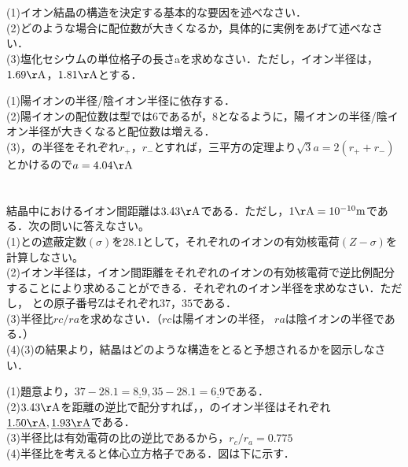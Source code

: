 \documentclass[dvipdfmx]{article}
\begin{document}
  \section{} 
    \begin{tcolorbox}[title=問題]
      (1)イオン結晶の構造を決定する基本的な要因を述べなさい．\\
      (2)どのような場合に配位数が大きくなるか，具体的に実例をあげて述べなさい．\\
      (3)塩化セシウムの単位格子の長さaを求めなさい．ただし，イオン半径は，$1.69 \mathrm{\AA}$，$1.81 \mathrm{\AA}$とする．
    \end{tcolorbox}    
    \begin{tcolorbox}[title=解答]
      (1)陽イオンの半径/陰イオン半径に依存する．\\
      (2)陽イオンの配位数は型では6であるが，8となるように，陽イオンの半径/陰イオン半径が大きくなると配位数は増える．\\
      (3)，の半径をそれぞれ$r_+$，$r_-$とすれば，三平方の定理より$\sqrt{3} a = 2(r_+ + r_-)$とかけるので$a = 4.04 \mathrm{\AA}$
    \end{tcolorbox}
  \section{}
    \begin{tcolorbox}[title=問題]
      結晶中におけるイオン間距離は$3.43 \mathrm{\AA}$である．ただし，$1 \mathrm{\AA}=10^{-10}\mathrm{m}$である．次の問いに答えなさい。\\
      (1)との遮蔽定数$(\sigma)$を$28.1$として，それぞれのイオンの有効核電荷$(Z-\sigma)$を計算しなさい。\\
      (2)イオン半径は，イオン間距離をそれぞれのイオンの有効核電荷で逆比例配分することにより求めることができる．それぞれのイオン半径を求めなさい．ただし，
      との原子番号Zはそれぞれ$37$，$35$である．\\
      (3)半径比$rc/ra$を求めなさい．（$rc$は陽イオンの半径， $ra$は陰イオンの半径である．）\\
      (4)(3)の結果より，結晶はどのような構造をとると予想されるかを図示しなさい．\\
    \end{tcolorbox}
    \begin{tcolorbox}[title=解答]
      (1)題意より，$37-28.1 = \underline{8.9}, 35 - 28.1 = \underline{6.9}$である．\\
      (2)$3.43\mathrm{\AA}$を距離の逆比で配分すれば，，のイオン半径はそれぞれ$\underline{1.50\mathrm{\AA}}, \underline{1.93\mathrm{\AA}}$である．\\
      (3)半径比は有効電荷の比の逆比であるから，$r_c/r_a =0.775$\\
      (4)半径比を考えると体心立方格子である．図は下に示す．
    
    \end{tcolorbox}
\end{document}
